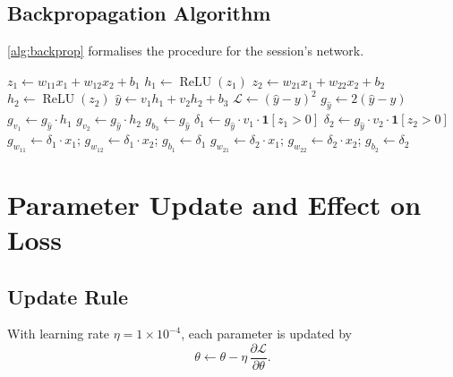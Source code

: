 \documentclass[12pt,a4paper]{article}
\newcommand{\Loss}{\mathcal{L}}
\newcommand{\ReLU}{\operatorname{ReLU}}
\newcommand{\pderiv}[2]{\dfrac{\partial #1}{\partial #2}}
\begin{document}
\subsection{Backpropagation Algorithm}

\cref{alg:backprop} formalises the procedure for the session's network.

\begin{algorithm}[ht]
\DontPrintSemicolon
\caption{Backpropagation for a single training sample}
\label{alg:backprop}
\BlankLine
{}
$z_1 \leftarrow w_{11}x_1 + w_{12}x_2 + b_1$\;
$h_1 \leftarrow \ReLU(z_1)$\;
$z_2 \leftarrow w_{21}x_1 + w_{22}x_2 + b_2$\;
$h_2 \leftarrow \ReLU(z_2)$\;
$\hat{y} \leftarrow v_1 h_1 + v_2 h_2 + b_3$\;
$\Loss \leftarrow (\hat{y} - y)^2$\;
\BlankLine
{}
$g_{\hat{y}} \leftarrow 2(\hat{y} - y)$\;
\BlankLine
{}
$g_{v_1} \leftarrow g_{\hat{y}} \cdot h_1$\;
$g_{v_2} \leftarrow g_{\hat{y}} \cdot h_2$\;
$g_{b_3} \leftarrow g_{\hat{y}}$\;
\BlankLine
{}
$\delta_1 \leftarrow g_{\hat{y}} \cdot v_1 \cdot \mathbf{1}[z_1 > 0]$\;
$\delta_2 \leftarrow g_{\hat{y}} \cdot v_2 \cdot \mathbf{1}[z_2 > 0]$\;
\BlankLine
{}
$g_{w_{11}} \leftarrow \delta_1 \cdot x_1$;\quad
$g_{w_{12}} \leftarrow \delta_1 \cdot x_2$;\quad
$g_{b_1} \leftarrow \delta_1$\;
$g_{w_{21}} \leftarrow \delta_2 \cdot x_1$;\quad
$g_{w_{22}} \leftarrow \delta_2 \cdot x_2$;\quad
$g_{b_2} \leftarrow \delta_2$\;
\BlankLine
{}
\Return{$\Theta$}\;
\end{algorithm}

\section{Parameter Update and Effect on Loss}
\label{sec:update}

\subsection{Update Rule}

With learning rate $\eta = 1 \times 10^{-4}$, each parameter is updated by
\begin{equation}
  \theta \leftarrow \theta - \eta\,\pderiv{\Loss}{\theta}.
  \label{eq:update-rule}
\end{equation}
\end{document}
